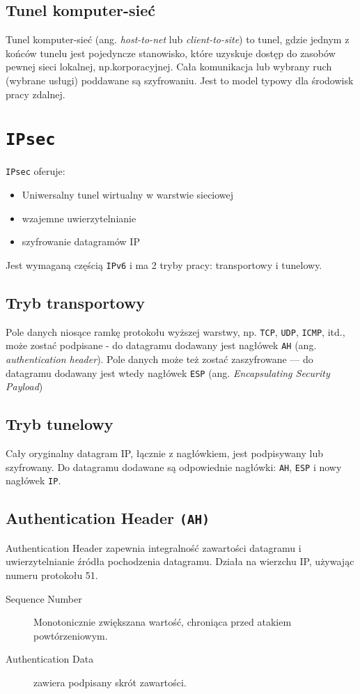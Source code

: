 \documentclass{article}
\begin{document}
\subsection{Tunel komputer-sieć}
Tunel komputer-sieć (ang. \emph{host-to-net} lub \emph{client-to-site}) to tunel, gdzie jednym
z końców tunelu jest pojedyncze stanowisko, które uzyskuje dostęp do zasobów pewnej sieci
lokalnej, np.\@ korporacyjnej. Cała komunikacja lub wybrany ruch (wybrane usługi) poddawane są
szyfrowaniu. Jest to model typowy dla środowisk pracy zdalnej.
\section{\tt IPsec}
{\tt IPsec} oferuje:
\begin{itemize}
  \item Uniwersalny tunel wirtualny w warstwie sieciowej
  \item wzajemne uwierzytelnianie
  \item szyfrowanie datagramów IP
\end{itemize}
Jest wymaganą częścią {\tt IPv6} i ma 2 tryby pracy: transportowy i tunelowy.
\subsection{Tryb transportowy}
Pole danych niosące ramkę protokołu wyższej warstwy, np. {\tt TCP}, {\tt UDP}, {\tt ICMP}, itd.,
może zostać podpisane - do datagramu dodawany jest nagłówek {\tt AH}
(ang. \emph{authentication header}). Pole danych może też zostać
zaszyfrowane --- do datagramu dodawany jest wtedy nagłówek {\tt ESP}
(ang. \emph{Encapsulating Security Payload})
\subsection{Tryb tunelowy}
Cały oryginalny datagram IP, łącznie z nagłówkiem, jest podpisywany lub szyfrowany. Do datagramu
dodawane są odpowiednie nagłówki: {\tt AH}, {\tt ESP} i nowy nagłówek {\tt IP}.
\pagebreak
\subsection{Authentication Header {\tt (AH)}}
Authentication Header zapewnia integralność zawartości datagramu i uwierzytelnianie źródła
pochodzenia datagramu. Działa na wierzchu IP, używając numeru protokołu 51.

\begin{description}
  \item[Sequence Number] Monotonicznie zwiększana wartość, chroniąca przed atakiem powtórzeniowym.
  \item[Authentication Data] zawiera podpisany skrót zawartości.
\end{description}
\end{document}
